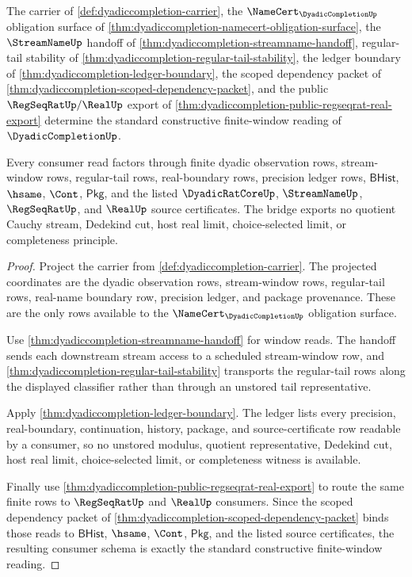 \begin{theorem}
\label{thm:dyadiccompletion-finite-window-standard-bridge}
The carrier of \autoref{def:dyadiccompletion-carrier}, the
$\NameCert_{\DyadicCompletionUp}$ obligation surface of
\autoref{thm:dyadiccompletion-namecert-obligation-surface}, the
$\StreamNameUp$ handoff of
\autoref{thm:dyadiccompletion-streamname-handoff}, regular-tail stability of
\autoref{thm:dyadiccompletion-regular-tail-stability}, the ledger boundary of
\autoref{thm:dyadiccompletion-ledger-boundary}, the scoped dependency packet of
\autoref{thm:dyadiccompletion-scoped-dependency-packet}, and the public
$\RegSeqRatUp/\RealUp$ export of
\autoref{thm:dyadiccompletion-public-regseqrat-real-export} determine the
standard constructive finite-window reading of $\DyadicCompletionUp$.

Every consumer read factors through finite dyadic observation rows,
stream-window rows, regular-tail rows, real-boundary rows, precision ledger
rows, $\mathsf{BHist}$, $\hsame$, $\Cont$, $\mathsf{Pkg}$, and the listed
$\DyadicRatCoreUp$, $\StreamNameUp$, $\RegSeqRatUp$, and $\RealUp$ source
certificates. The bridge exports no quotient Cauchy stream, Dedekind cut, host
real limit, choice-selected limit, or completeness principle.
\end{theorem}
\begin{proof}
Project the carrier from \autoref{def:dyadiccompletion-carrier}. The projected
coordinates are the dyadic observation rows, stream-window rows, regular-tail
rows, real-name boundary row, precision ledger, and package provenance. These
are the only rows available to the $\NameCert_{\DyadicCompletionUp}$ obligation
surface.

Use \autoref{thm:dyadiccompletion-streamname-handoff} for window reads. The
handoff sends each downstream stream access to a scheduled stream-window row,
and \autoref{thm:dyadiccompletion-regular-tail-stability} transports the
regular-tail rows along the displayed classifier rather than through an
unstored tail representative.

Apply \autoref{thm:dyadiccompletion-ledger-boundary}. The ledger lists every
precision, real-boundary, continuation, history, package, and source-certificate
row readable by a consumer, so no unstored modulus, quotient representative,
Dedekind cut, host real limit, choice-selected limit, or completeness witness is
available.

Finally use \autoref{thm:dyadiccompletion-public-regseqrat-real-export} to route
the same finite rows to $\RegSeqRatUp$ and $\RealUp$ consumers. Since the scoped
dependency packet of \autoref{thm:dyadiccompletion-scoped-dependency-packet}
binds those reads to $\mathsf{BHist}$, $\hsame$, $\Cont$, $\mathsf{Pkg}$, and
the listed source certificates, the resulting consumer schema is exactly the
standard constructive finite-window reading.
\end{proof}

